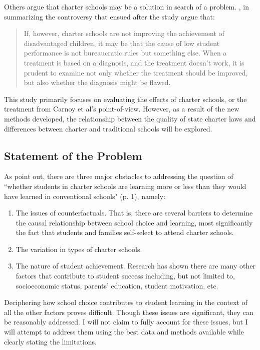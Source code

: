 \documentclass[letterpaper,12p,twoside]{article} %
\renewcommand{\normalsize}{\fontsize{12}{13}\selectfont}
\begin{document}
Others argue that charter schools may be a solution in search of a problem. , in summarizing the controversy that ensued after the  study argue that:

\begin{quote} \normalsize
If, however, charter schools are not improving the achievement of disadvantaged children, it may be that the cause of low student performance is not bureaucratic rules but something else. When a treatment is based on a diagnosis, and the treatment doesn't work, it is prudent to examine not only whether the treatment should be improved, but also whether the diagnosis might be flawed. \cite{carnoy2005}
\end{quote}

\noindent This study primarily focuses on evaluating the effects of charter schools, or the treatment from Carnoy et al's point-of-view. However, as a result of the new methods developed, the relationship between the quality of state charter laws and differences between charter and traditional schools will be explored.


\subsection{Statement of the Problem}

As  point out, there are three major obstacles to addressing the question of ``whether students in charter schools are learning more or less than they would have learned in conventional schools" (p. 1), namely:

\begin{enumerate}
\item The issues of counterfactuals. That is, there are several barriers to determine the causal relationship between school choice and learning, most significantly the fact that students and families self-select to attend charter schools.
\item The variation in types of charter schools.
\item The nature of student achievement. Research has shown there are many other factors that contribute to student success including, but not limited to, socioeconomic status, parents' education, student motivation, etc. \end{enumerate}

\noindent Deciphering how school choice contributes to student learning in the context of all the other factors proves difficult. Though these issues are significant, they can be reasonably addressed. I will not claim to fully account for these issues, but I will attempt to address them using the best data and methods available while clearly stating the limitations.
\end{document}
